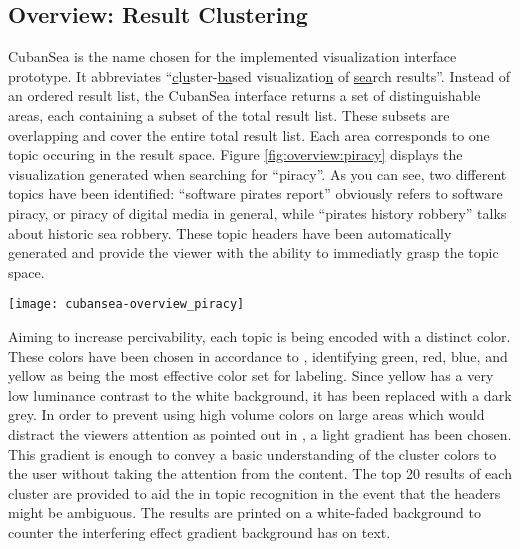 \subsection{Overview: Result Clustering}
CubanSea is the name chosen for the implemented visualization interface prototype. It abbreviates ``\underline{c}l\underline{u}ster-\underline{ba}sed visualizatio\underline{n} of \underline{sea}rch results''. Instead of an ordered result list, the CubanSea interface returns a set of distinguishable areas, each containing a subset of the total result list. These subsets are overlapping and cover the entire total result list. Each area corresponds to one topic occuring in the result space. Figure \ref{fig:overview:piracy} displays the visualization generated when searching for ``piracy''. As you can see, two different topics have been identified: ``software pirates report'' obviously refers to software piracy, or piracy of digital media in general, while ``pirates history robbery'' talks about historic sea robbery. These topic headers have been automatically generated and provide the viewer with the ability to immediatly grasp the topic space.
\begin{figure*}[!t]
	\centering
	\texttt{[image: cubansea-overview\_piracy]}
	\caption{Clusters generated for the query ``piracy''}
	\label{fig:overview:piracy}
\end{figure*}
Aiming to increase percivability, each topic is being encoded with a distinct color. These colors have been chosen in accordance to \cite{Berlin1969}, identifying green, red, blue, and yellow as being the most effective color set for labeling. Since yellow has a very low luminance contrast to the white background, it has been replaced with a dark grey. In order to prevent using high volume colors on large areas which would distract the viewers attention as pointed out in \cite{Ware2004}, a light gradient has been chosen. This gradient is enough to convey a basic understanding of the cluster colors to the user without taking the attention from the content. The top 20 results of each cluster are provided to aid the in topic recognition in the event that the headers might be ambiguous. The results are printed on a white-faded background to counter the interfering effect gradient background has on text.

